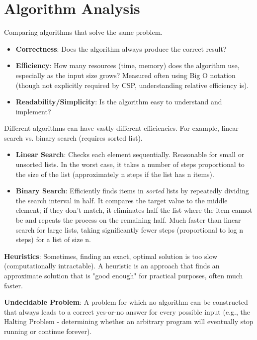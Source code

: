 \documentclass[11pt,oneside]{book}
\begin{document}
\section{Algorithm Analysis}
\label{sec:algorithm_analysis}
Comparing algorithms that solve the same problem.
\begin{itemize}
    \item \textbf{Correctness}: Does the algorithm always produce the correct result?
    \item \textbf{Efficiency}: How many resources (time, memory) does the algorithm use, especially as the input size grows? Measured often using Big O notation (though not explicitly required by CSP, understanding relative efficiency is).
    \item \textbf{Readability/Simplicity}: Is the algorithm easy to understand and implement?
\end{itemize}
Different algorithms can have vastly different efficiencies. For example, linear search vs. binary search (requires sorted list).
\begin{itemize}
    \item \textbf{Linear Search}: Checks each element sequentially. Reasonable for small or unsorted lists. In the worst case, it takes a number of steps proportional to the size of the list (approximately n steps if the list has n items).
    \item \textbf{Binary Search}: Efficiently finds items in \textit{sorted} lists by repeatedly dividing the search interval in half. It compares the target value to the middle element; if they don't match, it eliminates half the list where the item cannot be and repeats the process on the remaining half. Much faster than linear search for large lists, taking significantly fewer steps (proportional to log n steps) for a list of size n.
\end{itemize}
\textbf{Heuristics}: Sometimes, finding an exact, optimal solution is too slow (computationally intractable). A heuristic is an approach that finds an approximate solution that is "good enough" for practical purposes, often much faster.

\textbf{Undecidable Problem}: A problem for which no algorithm can be constructed that always leads to a correct yes-or-no answer for every possible input (e.g., the Halting Problem - determining whether an arbitrary program will eventually stop running or continue forever).
\end{document}
